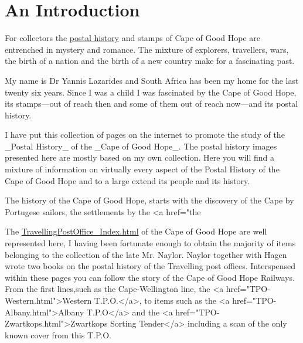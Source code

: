 
\section{An Introduction
} 
For collectors  the \href{../general/postal_history}{postal history} and 
stamps of Cape of Good Hope are entrenched in mystery and romance. 
The mixture of explorers, travellers, wars, the birth of a nation and the birth of 
a new country make for a fascinating past. 

My name is Dr Yannis Lazarides and South Africa has been my home for the 
last twenty six years. Since I was a child I was fascinated by the Cape of Good Hope, 
its stamps---out of reach then and some of them out of reach now---and its postal history. 

I have put this collection of pages on the internet to promote the study of 
the _Postal History_  of the  _Cape of Good Hope_. 
The postal history images presented here are mostly based on my own collection. Here you will find a mixture of information on virtually every aspect of the Postal History of the Cape of Good Hope and to a large extend its people and its history. 

The history of the Cape of Good Hope, 
starts with the discovery of the Cape by Portugese sailors, the settlements by the <a href="the%


The \href{../cape-of-good-hope/TPO}{TravellingPostOffice_Index.html} of the Cape of Good Hope are well represented here,  I having been fortunate enough to obtain the majority of items belonging to the collection of 
the late Mr. Naylor. 
Naylor together with Hagen wrote two books on the postal history 
of the Travelling post offices. Interspensed within these pages 
you can follow the story of the Cape of Good Hope Railways. From the first 
lines,such as the Cape-Wellington line, the 
<a href="TPO-Western.html">Western T.P.O.</a>, to 
items such as the <a href="TPO-Albany.html">Albany T.P.O</a> and 
the <a href="TPO-Zwartkops.html">Zwartkops Sorting Tender</a> 
including a scan of the only known cover from this T.P.O.

